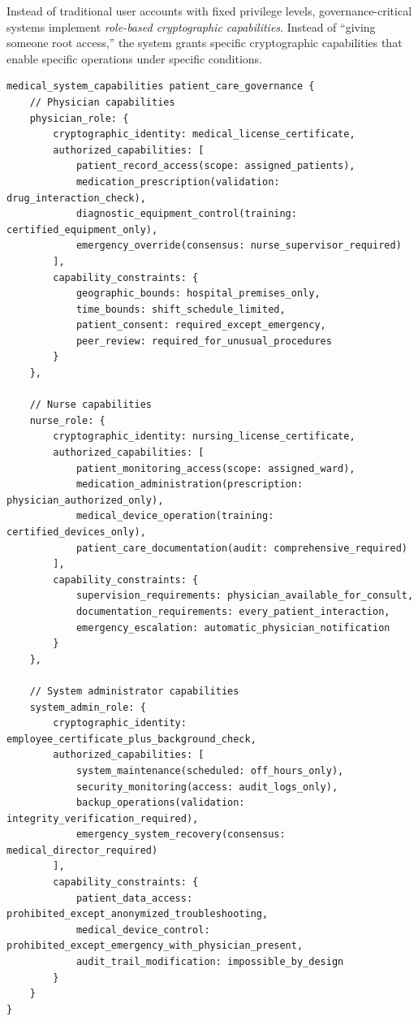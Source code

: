 Instead of traditional user accounts with fixed privilege levels, governance-critical systems implement \textit{role-based cryptographic capabilities}. Instead of ``giving someone root access,'' the system grants specific cryptographic capabilities that enable specific operations under specific conditions.

\begin{lstlisting}[language=rift, caption=Cryptographic Capability Architecture for Medical Systems]
medical_system_capabilities patient_care_governance {
    // Physician capabilities
    physician_role: {
        cryptographic_identity: medical_license_certificate,
        authorized_capabilities: [
            patient_record_access(scope: assigned_patients),
            medication_prescription(validation: drug_interaction_check),
            diagnostic_equipment_control(training: certified_equipment_only),
            emergency_override(consensus: nurse_supervisor_required)
        ],
        capability_constraints: {
            geographic_bounds: hospital_premises_only,
            time_bounds: shift_schedule_limited,
            patient_consent: required_except_emergency,
            peer_review: required_for_unusual_procedures
        }
    },
    
    // Nurse capabilities  
    nurse_role: {
        cryptographic_identity: nursing_license_certificate,
        authorized_capabilities: [
            patient_monitoring_access(scope: assigned_ward),
            medication_administration(prescription: physician_authorized_only),
            medical_device_operation(training: certified_devices_only),
            patient_care_documentation(audit: comprehensive_required)
        ],
        capability_constraints: {
            supervision_requirements: physician_available_for_consult,
            documentation_requirements: every_patient_interaction,
            emergency_escalation: automatic_physician_notification
        }
    },
    
    // System administrator capabilities
    system_admin_role: {
        cryptographic_identity: employee_certificate_plus_background_check,
        authorized_capabilities: [
            system_maintenance(scheduled: off_hours_only),
            security_monitoring(access: audit_logs_only),
            backup_operations(validation: integrity_verification_required),
            emergency_system_recovery(consensus: medical_director_required)
        ],
        capability_constraints: {
            patient_data_access: prohibited_except_anonymized_troubleshooting,
            medical_device_control: prohibited_except_emergency_with_physician_present,
            audit_trail_modification: impossible_by_design
        }
    }
}
\end{lstlisting}

